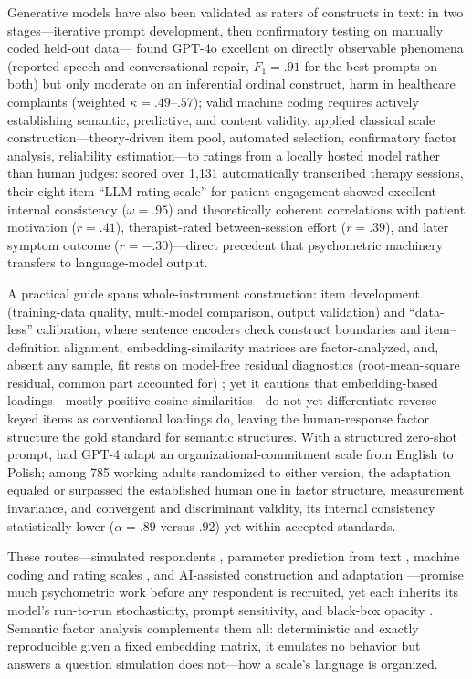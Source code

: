 Generative models have also been validated as raters of constructs in text: in two stages---iterative prompt development, then confirmatory testing on manually coded held-out data---\citet{bunt-etal-2025} found GPT-4o excellent on directly observable phenomena (reported speech and conversational repair, $F_{1} = .91$ for the best prompts on both) but only moderate on an inferential ordinal construct, harm in healthcare complaints (weighted $\kappa = .49$--$.57$); valid machine coding requires actively establishing semantic, predictive, and content validity. \citet{eberhardt-etal-2025} applied classical scale construction---theory-driven item pool, automated selection, confirmatory factor analysis, reliability estimation---to ratings from a locally hosted model rather than human judges: scored over 1{,}131 automatically transcribed therapy sessions, their eight-item ``LLM rating scale'' for patient engagement showed excellent internal consistency ($\omega = .95$) and theoretically coherent correlations with patient motivation ($r = .41$), therapist-rated between-session effort ($r = .39$), and later symptom outcome ($r = -.30$)---direct precedent that psychometric machinery transfers to language-model output.

A practical guide spans whole-instrument construction: item development (training-data quality, multi-model comparison, output validation) and ``data-less'' calibration, where sentence encoders check construct boundaries and item--definition alignment, embedding-similarity matrices are factor-analyzed, and, absent any sample, fit rests on model-free residual diagnostics (root-mean-square residual, common part accounted for) \citep{suarez-alvarez-etal-2026}; yet it cautions that embedding-based loadings---mostly positive cosine similarities---do not yet differentiate reverse-keyed items as conventional loadings do, leaving the human-response factor structure the gold standard for semantic structures. With a structured zero-shot prompt, \citet{grobelny-etal-2025} had GPT-4 adapt an organizational-commitment scale from English to Polish; among 785 working adults randomized to either version, the adaptation equaled or surpassed the established human one in factor structure, measurement invariance, and convergent and discriminant validity, its internal consistency statistically lower ($\alpha = .89$ versus $.92$) yet within accepted standards.

These routes---simulated respondents \citep{liu-etal-2025,lim-etal-2025}, parameter prediction from text \citep{peters-etal-2025}, machine coding and rating scales \citep{bunt-etal-2025,eberhardt-etal-2025}, and AI-assisted construction and adaptation \citep{suarez-alvarez-etal-2026,grobelny-etal-2025}---promise much psychometric work before any respondent is recruited, yet each inherits its model's run-to-run stochasticity, prompt sensitivity, and black-box opacity \citep{bunt-etal-2025}. Semantic factor analysis complements them all: deterministic and exactly reproducible given a fixed embedding matrix, it emulates no behavior but answers a question simulation does not---how a scale's language is organized.
